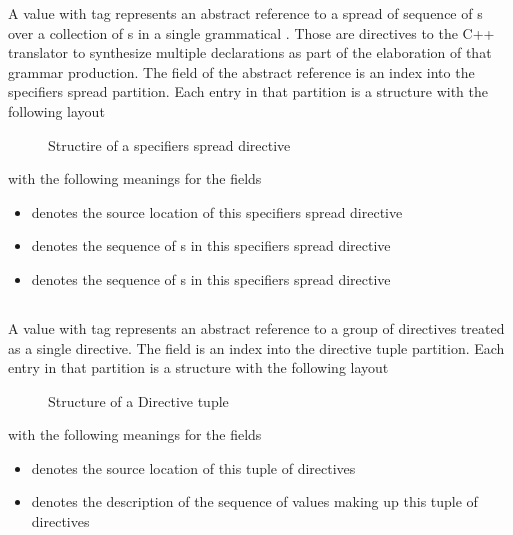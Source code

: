 A  value with tag  represents an abstract reference to a spread of sequence of s 
over a collection of s in a single grammatical . 
Those are directives to the C++ translator to synthesize multiple declarations as part of the elaboration of that grammar production.
The  field of the abstract reference is an index into the specifiers spread partition.
Each entry in that partition is a structure with the following layout
%
\begin{figure}[H]
    \centering
    \caption{Structire of a specifiers spread directive}
    \label{fig:ifc:DirSort:SpecifiersSpread}
\end{figure}
%
with the following meanings for the fields
\begin{itemize}
    \item {} denotes the source location of this specifiers spread directive
    \item {} denotes the sequence of s in this specifiers spread directive
    \item {} denotes the sequence of s in this specifiers spread directive
\end{itemize}




\subsection{}
\label{sec:ifc:DirSort:Tuple}

A  value with tag  represents an abstract reference to a group of directives treated as a single directive.
The  field is an index into the directive tuple partition.
Each entry in that partition is a structure with the following layout
%
\begin{figure}[H]
    \centering
    \caption{Structure of a Directive tuple}
    \label{fig:ifc:DirSort:Tuple}
\end{figure}
%
with the following meanings for the fields
\begin{itemize}
    \item {} denotes the source location of this tuple of directives
    \item {} denotes the description of the sequence of  values making up this tuple of directives 
\end{itemize}

